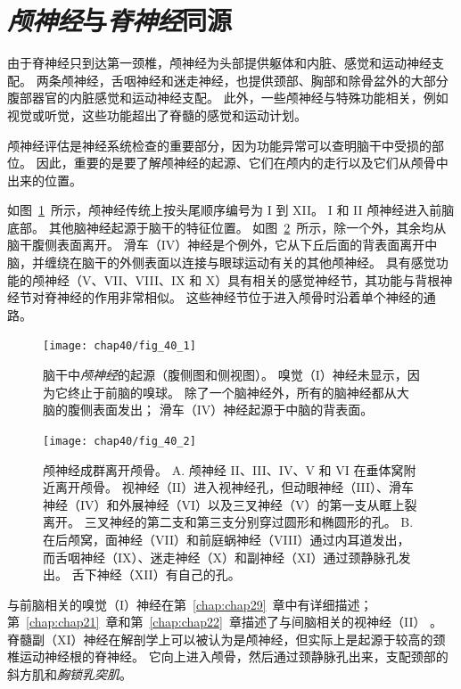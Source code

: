 \section{\textit{颅神经}与\textit{脊神经}同源}

由于脊神经只到达第一颈椎，颅神经为头部提供躯体和内脏、感觉和运动神经支配。
两条颅神经，舌咽神经和迷走神经，也提供颈部、胸部和除骨盆外的大部分腹部器官的内脏感觉和运动神经支配。
此外，一些颅神经与特殊功能相关，例如视觉或听觉，这些功能超出了脊髓的感觉和运动计划。


颅神经评估是神经系统检查的重要部分，因为功能异常可以查明脑干中受损的部位。
因此，重要的是要了解颅神经的起源、它们在颅内的走行以及它们从颅骨中出来的位置。


如图~\ref{fig:40_1}~所示，颅神经传统上按头尾顺序编号为 I 到 XII。
I 和 II 颅神经进入前脑底部。
其他脑神经起源于脑干的特征位置。
如图~\ref{fig:40_2}~所示，除一个外，其余均从脑干腹侧表面离开。
滑车（IV）神经是个例外，它从下丘后面的背表面离开中脑，并缠绕在脑干的外侧表面以连接与眼球运动有关的其他颅神经。
具有感觉功能的颅神经（V、VII、VIII、IX 和 X）具有相关的感觉神经节，其功能与背根神经节对脊神经的作用非常相似。
这些神经节位于进入颅骨时沿着单个神经的通路。


\begin{figure}[htbp]
	\centering
	\texttt{[image: chap40/fig\_40\_1]}
	\caption{脑干中\textit{颅神经}的起源（腹侧图和侧视图）。
		嗅觉（I）神经未显示，因为它终止于前脑的嗅球。
		除了一个脑神经外，所有的脑神经都从大脑的腹侧表面发出； 
		滑车（IV）神经起源于中脑的背表面。}
	\label{fig:40_1}
\end{figure}


\begin{figure}[htbp]
	\centering
	\texttt{[image: chap40/fig\_40\_2]}
	\caption{颅神经成群离开颅骨。
		A. 颅神经 II、III、IV、V 和 VI 在垂体窝附近离开颅骨。
		视神经（II）进入视神经孔，但动眼神经（III）、滑车神经（IV）和外展神经（VI）以及三叉神经（V）的第一支从眶上裂离开。
		三叉神经的第二支和第三支分别穿过圆形和椭圆形的孔。
		B. 在后颅窝，面神经（VII）和前庭蜗神经（VIII）通过内耳道发出，而舌咽神经（IX）、迷走神经（X）和副神经（XI）通过颈静脉孔发出。
		舌下神经（XII）有自己的孔。}
	\label{fig:40_2}
\end{figure}



与前脑相关的嗅觉（I）神经在第~\ref{chap:chap29}~章中有详细描述；
第~\ref{chap:chap21}~章和第~\ref{chap:chap22}~章描述了与间脑相关的视神经（II） 。
脊髓副（XI）神经在解剖学上可以被认为是颅神经，但实际上是起源于较高的颈椎运动神经根的脊神经。
它向上进入颅骨，然后通过颈静脉孔出来，支配颈部的斜方肌和\textit{胸锁乳突肌}。



